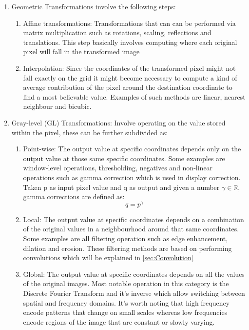 \begin{enumerate}
\item Geometric Transformations involve the following steps:
		\begin{enumerate}
		\item Affine transformations: Transformations that can can be performed via matrix multiplication such as rotations, scaling, reflections and translations. This step basically involves computing where each original pixel will fall in the transformed image
		\item Interpolation: Since the coordinates of the transformed pixel might not fall exactly on the grid it might become necessary to compute a kind of average contribution of the pixel around the destination coordinate to find a most believable value. Examples of such methods are linear, nearest neighbour and bicubic. 
		\end{enumerate}
\item Gray-level (GL) Transformations: Involve operating on the value stored within the pixel, these can be further subdivided as:
		\begin{enumerate}
		\item Point-wise: The output value at specific coordinates depends only on the output value at those same specific coordinates. Some examples are window-level operations, thresholding, negatives and non-linear operations such as gamma correction which is used in display correction. Taken p as input pixel value and q as output and given a number $\gamma \in \mathbb{R}$, gamma corrections are defined as:
		\begin{equation}
		q = p^{\gamma}
		\end{equation}
		\item Local: The output value at specific coordinates depends on a combination of the original values in a neighbourhood around that same coordinates. Some examples are all filtering operation such as edge enhancement, dilation and erosion. These filtering methods are based on performing convolutions which will be explained in \ref{sec:Convolution}
		\item Global: The output value at specific coordinates depends on all the values of the original images. Most notable operation in this category is the Discrete Fourier Transform and it's inverse which allow switching between spatial and frequency domains. It's worth noting that high frequency encode patterns that change on small scales whereas low frequencies encode regions of the image that are constant or slowly varying.
		\end{enumerate}
\end{enumerate}

